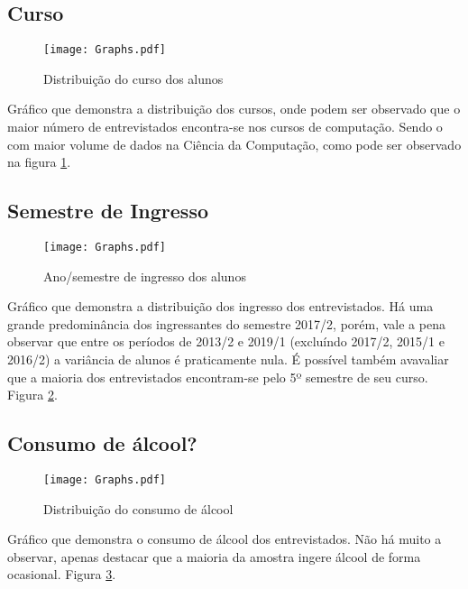 \documentclass[11pt]{scrartcl} %
\begin{document}
\subsection{Curso}

\begin{figure}[h]
  \centering
  \texttt{[image: Graphs.pdf]}
  \caption{Distribuição do curso dos alunos}
  \label{fig:graph1}
\end{figure}

Gráfico que demonstra a distribuição dos cursos, onde podem ser observado que o maior número de entrevistados encontra-se nos cursos de computação. Sendo o com maior volume de dados na Ciência da Computação, como pode ser observado na figura \ref{fig:graph1}.

\clearpage

\subsection{Semestre de Ingresso}

\begin{figure}[h]
  \centering
  \texttt{[image: Graphs.pdf]}
  \label{fig:graph2}
  \caption{Ano/semestre de ingresso dos alunos}
\end{figure}

Gráfico que demonstra a distribuição dos ingresso dos entrevistados. Há uma grande predominância dos ingressantes do semestre 2017/2, porém, vale a pena observar que entre os períodos de 2013/2 e 2019/1 (excluíndo 2017/2, 2015/1 e 2016/2) a variância de alunos é praticamente nula. É possível também avavaliar que a maioria dos entrevistados encontram-se pelo 5º semestre de seu curso. Figura \ref{fig:graph2}.

\clearpage

\subsection{Consumo de álcool?}

\begin{figure}[h]
  \centering
  \texttt{[image: Graphs.pdf]}
  \label{fig:graph3}
  \caption{Distribuição do consumo de álcool}
\end{figure}

Gráfico que demonstra o consumo de álcool dos entrevistados. Não há muito a observar, apenas destacar que a maioria da amostra ingere álcool de forma ocasional.  Figura \ref{fig:graph3}.
\end{document}
